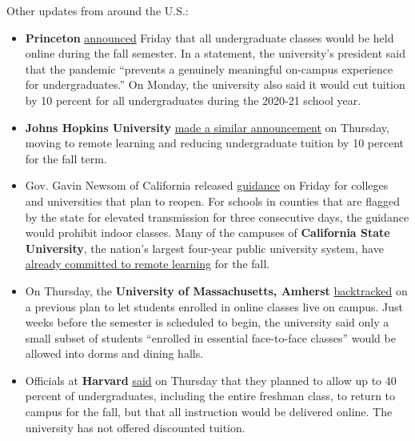 Other updates from around the U.S.:

\begin{itemize}
\item
  \textbf{Princeton}
  \href{https://www.princeton.edu/news/2020/08/07/fall-2020-update-undergraduate-education-be-fully-remote}{announced}
  Friday that all undergraduate classes would be held online during the
  fall semester. In a statement, the university's president said that
  the pandemic ``prevents a genuinely meaningful on-campus experience
  for undergraduates.'' On Monday, the university also said it would cut
  tuition by 10 percent for all undergraduates during the 2020-21 school
  year.
\item
  \textbf{Johns Hopkins University}
  \href{https://hub.jhu.edu/2020/08/06/university-moves-undergraduate-instruction-online/}{made
  a similar announcement} on Thursday, moving to remote learning and
  reducing undergraduate tuition by 10 percent for the fall term.
\item
  Gov. Gavin Newsom of California released
  \href{https://files.covid19.ca.gov/pdf/guidance-higher-education--en.pdf}{guidance}
  on Friday for colleges and universities that plan to reopen. For
  schools in counties that are flagged by the state for elevated
  transmission for three consecutive days, the guidance would prohibit
  indoor classes. Many of the campuses of \textbf{California State
  University}, the nation's largest four-year public university system,
  have
  \href{https://www.nytimes.com/2020/05/12/us/cal-state-online-classes.html}{already
  committed to remote learning} for the fall.
\item
  On Thursday, the \textbf{University of Massachusetts, Amherst}
  \href{https://www.umass.edu/coronavirus/news/significant-changes-our-fall-reopening-plan}{backtracked}
  on a previous plan to let students enrolled in online classes live on
  campus. Just weeks before the semester is scheduled to begin, the
  university said only a small subset of students ``enrolled in
  essential face-to-face classes'' would be allowed into dorms and
  dining halls.
\item
  Officials at \textbf{Harvard}
  \href{https://www.fas.harvard.edu/fas-decision-2020-2021-academic-year}{said}
  on Thursday that they planned to allow up to 40 percent of
  undergraduates, including the entire freshman class, to return to
  campus for the fall, but that all instruction would be delivered
  online. The university has not offered discounted tuition.
\end{itemize}

